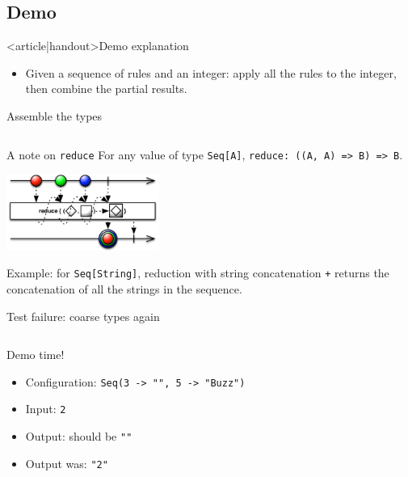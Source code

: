 \subsection{Demo}

\begin{frame}<article|handout>{Demo explanation}
  \begin{itemize}
  \item Given a sequence of rules and an integer: apply all the rules to the integer, then combine the partial results.
  \end{itemize}

\end{frame}

\begin{frame}[label=first-general,fragile]{Assemble the types}
  \inputminted[gobble=2]{scala}{FizzBuzz5.scala}
\end{frame}

\begin{frame}[fragile]{A note on \texttt{reduce}}
  For any value of type \texttt{Seq[A]}, \texttt{reduce: ((A, A) => B) => B}.
  \begin{center}
    \includegraphics[height=2.5cm]{reduce.png}
  \end{center}

  Example: for \texttt{Seq[String]}, reduction with string concatenation \texttt{+} returns the concatenation of all the strings in the sequence.
\end{frame}

\begin{frame}[fragile]{Test failure: coarse types again}
  \inputminted[gobble=2]{console}{testQuick9.console}

  \begin{block}{Demo time!}
    \begin{itemize}
    \item Configuration: \texttt{Seq(3 -> "", 5 -> "Buzz")}
    \item Input: \texttt{2}
    \item Output: should be \texttt{""}
    \item Output was: \texttt{"2"}
    \end{itemize}
  \end{block}
\end{frame}

